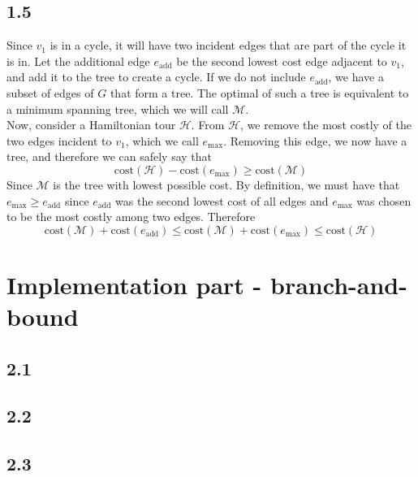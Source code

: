 \documentclass[12pt]{article}
\begin{document}
\subsection*{1.5}

Since $v_1$ is in a cycle, it will have two incident edges that are part of the cycle it is in. Let the additional edge $e_\text{add}$ be the second lowest cost edge adjacent to $v_1$, and add it to the tree to create a cycle. If we do not include $e_\text{add}$, we have a subset of edges of $G$ that form a tree. The optimal of such a tree is equivalent to a minimum spanning tree, which we will call $\mathcal{M}$.\\
Now, consider a Hamiltonian tour $\mathcal{H}$. From $\mathcal{H}$, we remove the most costly of the two edges incident to $v_1$, which we call $e_{\max}$. Removing this edge, we now have a tree, and therefore we can safely say that
$$
\text{cost}(\mathcal{H} ) - \text{cost}(e_{\max}) \geq \text{cost}(\mathcal{M})
$$
Since $\mathcal{M}$ is the tree with lowest possible cost. By definition, we must have that $e_{\max} \geq e_\text{add}$ since $e_\text{add}$ was the second lowest cost of all edges and $e_{\max}$ was chosen to be the most costly among two edges. Therefore
$$
\text{cost}(\mathcal{M}) + \text{cost}(e_\text{add}) \leq \text{cost}(\mathcal{M}) + \text{cost}(e_\text{max}) \leq \text{cost}(\mathcal{H})
$$


\section*{Implementation part - branch-and-bound}
\subsection*{2.1}
\subsection*{2.2}
\subsection*{2.3}
\end{document}
